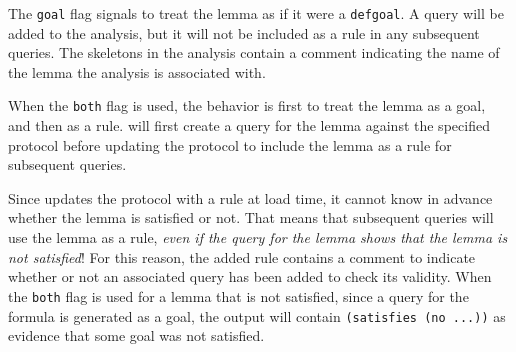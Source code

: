 The \texttt{goal} flag signals {\cpsa} to treat the lemma as if
it were a \texttt{defgoal}. A query will be added to the analysis, but
it will not be included as a rule in any subsequent queries. The
skeletons in the analysis contain a comment indicating the name of the
lemma the analysis is associated with.

When the \texttt{both} flag is used, the behavior is first to treat
the lemma as a goal, and then as a rule. {\cpsa} will first create a
query for the lemma against the specified protocol before updating the
protocol to include the lemma as a rule for subsequent queries.

Since {\cpsa} updates the protocol with a rule at load time, it cannot
know in advance whether the lemma is satisfied or not. That means that
subsequent queries will use the lemma as a rule, \emph{even if the
  query for the lemma shows that the lemma is not satisfied}! For this
reason, the added rule contains a comment to indicate whether or not
an associated query has been added to check its validity. When the
\texttt{both} flag is used for a lemma that is not satisfied, since a
query for the formula is generated as a goal, the output will contain
\texttt{(satisfies (no ...))} as evidence that some goal was not
satisfied.



